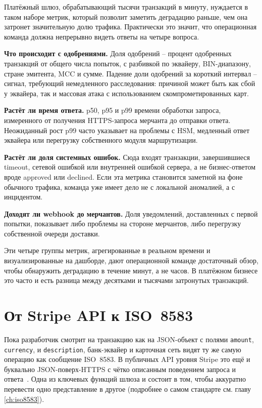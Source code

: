 Платёжный шлюз, обрабатывающий тысячи транзакций в минуту,
нуждается в таком наборе метрик, который позволит заметить
деградацию раньше, чем она затронет значительную долю трафика.
Практически это значит, что операционная команда должна
непрерывно видеть ответы на четыре вопроса.

\textbf{Что происходит с одобрениями.} Доля одобрений -- процент одобренных транзакций
от общего числа попыток, с разбивкой по эквайеру, BIN-диапазону,
стране эмитента, MCC и сумме. Падение доли одобрений
за короткий интервал -- сигнал, требующий немедленного
расследования: причиной может быть как сбой у эквайера, так
и массовая атака с использованием скомпрометированных карт.

\textbf{Растёт ли время ответа.} p50, p95 и p99 времени обработки
запроса, измеренного от получения HTTPS-запроса мерчанта
до отправки ответа. Неожиданный рост p99 часто указывает
на проблемы с HSM, медленный ответ эквайера или перегрузку
собственного модуля маршрутизации.

\textbf{Растёт ли доля системных ошибок.} Сюда входят транзакции,
завершившиеся timeout, сетевой ошибкой или внутренней ошибкой сервера,
а не бизнес-ответом вроде approved или declined. Если эта
метрика становится заметной на фоне обычного трафика, команда
уже имеет дело не с локальной аномалией, а с инцидентом.

\textbf{Доходят ли webhook до мерчантов.} Доля уведомлений,
доставленных с первой попытки, показывает либо проблемы
на стороне мерчантов, либо перегрузку собственной очереди
доставки.

Эти четыре группы метрик, агрегированные в реальном времени
и визуализированные на дашборде, дают операционной команде
достаточный обзор, чтобы обнаружить деградацию в течение минут,
а не часов. В платёжном бизнесе это часто и есть разница между
десятками и тысячами затронутых транзакций.

\section{От Stripe API к ISO~8583}
\label{sec:gw-api-to-iso}

Пока разработчик смотрит на транзакцию как на JSON-объект
с полями \texttt{amount}, \texttt{currency},
 и \texttt{description}, банк-эквайер
и карточная сеть видят ту же самую операцию как сообщение
ISO~8583. В публичных API уровня Stripe это ещё и буквально
JSON-поверх-HTTPS с чётко описанным поведением запроса
и ответа~\cite{stripe-api-reference}. Одна из ключевых
функций шлюза и состоит в том, чтобы аккуратно перевести одно
представление в другое (подробнее о самом стандарте см.
главу \ref{ch:iso8583}).

